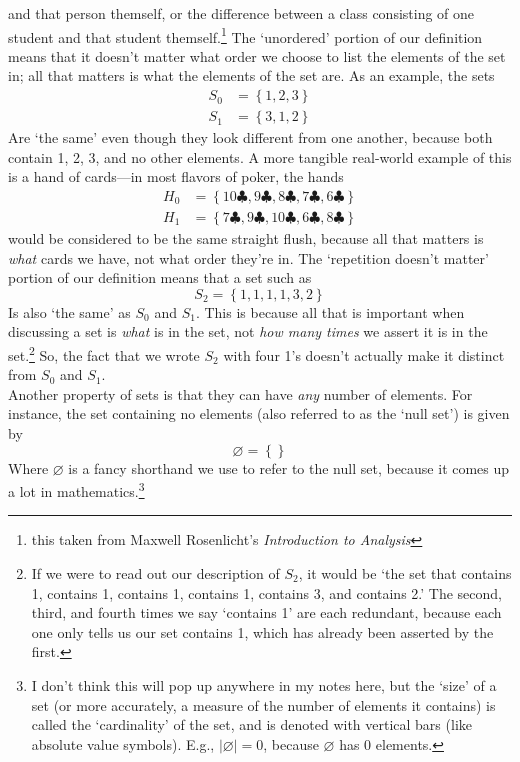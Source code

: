 \documentclass[10pt]{article}
\theoremstyle{definition}
\newcommand{\set}[1]{\left\{ #1 \right\}}
\begin{document}
and that person themself, or the difference between a class consisting
of one student and that student themself.\footnote{this taken from
  Maxwell Rosenlicht's \textit{Introduction to Analysis}}  The
`unordered' portion of our definition means that it doesn't matter
what order we choose to list the elements of the set in; all that
matters is what the elements of the set are.  As an example, the sets
\begin{align*}
S_0 &= \set{1,2,3}\\
S_1 &= \set{3,1,2}
\end{align*}
Are `the same' even though they look different from one another,
because both contain 1, 2, 3, and no other elements.  A more tangible
real-world example of this is a hand of cards---in most flavors of
poker, the hands
\begin{align*}
H_0 &= \set{10\clubsuit,9\clubsuit, 8\clubsuit, 7\clubsuit, 6\clubsuit}\\
H_1 &= \set{7\clubsuit,9\clubsuit, 10\clubsuit, 6\clubsuit, 8\clubsuit}
\end{align*}
would be considered to be the same straight flush, because all that
matters is \emph{what} cards we have, not what order they're in.  The
`repetition doesn't matter' portion of our definition means that a set
such as
\[S_2 = \set{1,1,1,1,3,2}\]
Is also `the same' as $S_0$ and $S_1$.  This is because all that is
important when discussing a set is \emph{what} is in the set, not
\emph{how many times} we assert it is in the set.\footnote{If we were
  to read out our description of $S_2$, it would be `the set that
  contains 1, contains 1, contains 1, contains 1, contains 3, and
  contains 2.'  The second, third, and fourth times we say `contains
  1' are each redundant, because each one only tells us our set
  contains 1, which has already been asserted by the first.}  So, the
fact that we wrote $S_2$ with four 1's doesn't actually make it
distinct from $S_0$ and $S_1$.
\\
Another property of sets is that they can have \emph{any} number of
elements.  For instance, the set containing no elements (also referred
to as the `null set') is given by
\[\varnothing = \set{}\]
Where $\varnothing$ is a fancy shorthand we use to refer to the null
set, because it comes up a lot in mathematics.\footnote{I don't think
  this will pop up anywhere in my notes here, but the `size' of a set
  (or more accurately, a measure of the number of elements it
  contains) is called the `cardinality' of the set, and is denoted
  with vertical bars (like absolute value symbols).  E.g.,
  $|\varnothing| = 0$, because $\varnothing$ has 0 elements.}
\end{document}
